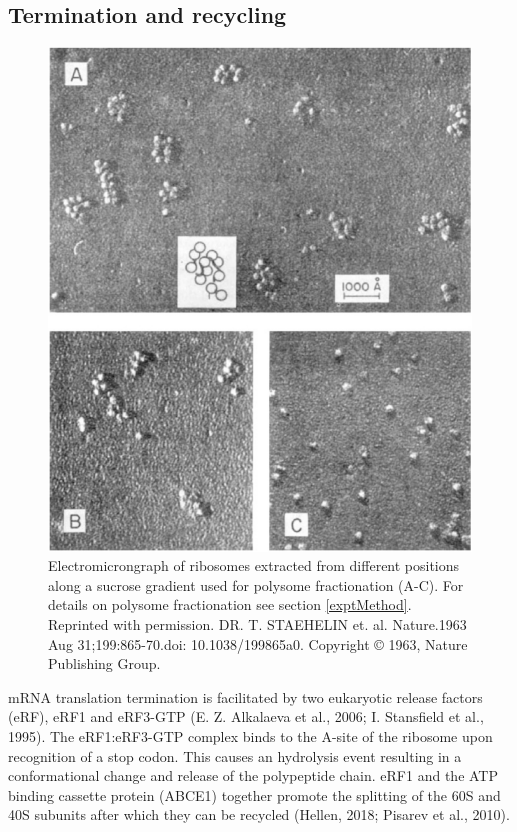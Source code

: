 \documentclass[12pt,openany]{book}
\begin{document}
\subsection{Termination and recycling}\begin{figure}
  \includegraphics{./figures/polysome.pdf}
  \caption{Electromicrongraph of ribosomes extracted from different positions along a sucrose gradient used for polysome fractionation (A-C). For details on polysome fractionation see section \ref{exptMethod}. Reprinted with permission. DR. T. STAEHELIN et. al. Nature.1963 Aug 31;199:865-70.doi: 10.1038/199865a0. Copyright © 1963, Nature Publishing Group.
 \label{fig:polysomes}}
\end{figure}

mRNA translation termination is facilitated by two eukaryotic release
factors (eRF), eRF1 and eRF3-GTP (E. Z. Alkalaeva et al., 2006; I.
Stansfield et al., 1995). The eRF1:eRF3-GTP complex binds to the A-site
of the ribosome upon recognition of a stop codon. This causes an
hydrolysis event resulting in a conformational change and release of the
polypeptide chain. eRF1 and the ATP binding cassette protein (ABCE1)
together promote the splitting of the 60S and 40S subunits after which
they can be recycled (Hellen, 2018; Pisarev et al., 2010).
\end{document}
